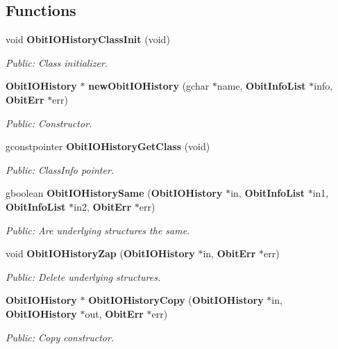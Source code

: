 \subsection*{Functions}
\begin{CompactItemize}
\item 
void {\bf Obit\-IOHistory\-Class\-Init} (void)
\begin{CompactList}\small\item\em Public: Class initializer. \item\end{CompactList}\item 
{\bf Obit\-IOHistory} $\ast$ {\bf new\-Obit\-IOHistory} (gchar $\ast$name, {\bf Obit\-Info\-List} $\ast$info, {\bf Obit\-Err} $\ast$err)
\begin{CompactList}\small\item\em Public: Constructor. \item\end{CompactList}\item 
gconstpointer {\bf Obit\-IOHistory\-Get\-Class} (void)
\begin{CompactList}\small\item\em Public: Class\-Info pointer. \item\end{CompactList}\item 
gboolean {\bf Obit\-IOHistory\-Same} ({\bf Obit\-IOHistory} $\ast$in, {\bf Obit\-Info\-List} $\ast$in1, {\bf Obit\-Info\-List} $\ast$in2, {\bf Obit\-Err} $\ast$err)
\begin{CompactList}\small\item\em Public: Are underlying structures the same. \item\end{CompactList}\item 
void {\bf Obit\-IOHistory\-Zap} ({\bf Obit\-IOHistory} $\ast$in, {\bf Obit\-Err} $\ast$err)
\begin{CompactList}\small\item\em Public: Delete underlying structures. \item\end{CompactList}\item 
{\bf Obit\-IOHistory} $\ast$ {\bf Obit\-IOHistory\-Copy} ({\bf Obit\-IOHistory} $\ast$in, {\bf Obit\-IOHistory} $\ast$out, {\bf Obit\-Err} $\ast$err)
\begin{CompactList}\small\item\em Public: Copy constructor. \item\end{CompactList}\item 

\end{CompactItemize}
